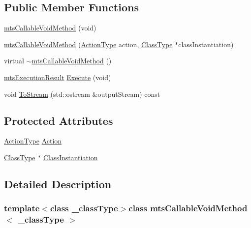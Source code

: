 \subsection*{Public Member Functions}
\begin{DoxyCompactItemize}
\item 
\hyperlink{classmts_callable_void_method_a158a2148635b673b555cb8dcd086d1c7}{mts\-Callable\-Void\-Method} (void)
\item 
\hyperlink{classmts_callable_void_method_afb25fb92ad9d9e3da75bdd5366825d10}{mts\-Callable\-Void\-Method} (\hyperlink{classmts_callable_void_method_a04f6bc9a458aded32b2419d0fc63da4a}{Action\-Type} action, \hyperlink{classmts_callable_void_method_a912290d7a57cc13fd33481e16d471467}{Class\-Type} $\ast$class\-Instantiation)
\item 
virtual \hyperlink{classmts_callable_void_method_acef41c52bec2a6e4006fcd0b69e632d3}{$\sim$mts\-Callable\-Void\-Method} ()
\item 
\hyperlink{classmts_execution_result}{mts\-Execution\-Result} \hyperlink{classmts_callable_void_method_afb66294b89a3c6281c70c462e3bf6c85}{Execute} (void)
\item 
void \hyperlink{classmts_callable_void_method_a252f8bc56f87741e9ad72319ead73302}{To\-Stream} (std\-::ostream \&output\-Stream) const 
\end{DoxyCompactItemize}
\subsection*{Protected Attributes}
\begin{DoxyCompactItemize}
\item 
\hyperlink{classmts_callable_void_method_a04f6bc9a458aded32b2419d0fc63da4a}{Action\-Type} \hyperlink{classmts_callable_void_method_a120365b9d9e484ec6c6d8dd4b5259abd}{Action}
\item 
\hyperlink{classmts_callable_void_method_a912290d7a57cc13fd33481e16d471467}{Class\-Type} $\ast$ \hyperlink{classmts_callable_void_method_a51691984cb4776eeb1e7871df86b463e}{Class\-Instantiation}
\end{DoxyCompactItemize}


\subsection{Detailed Description}
\subsubsection*{template$<$class \-\_\-class\-Type$>$class mts\-Callable\-Void\-Method$<$ \-\_\-class\-Type $>$}


